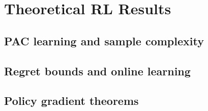 
\section{Theoretical RL Results}

\subsection{PAC learning and sample complexity}


\subsection{Regret bounds and online learning}


\subsection{Policy gradient theorems}

